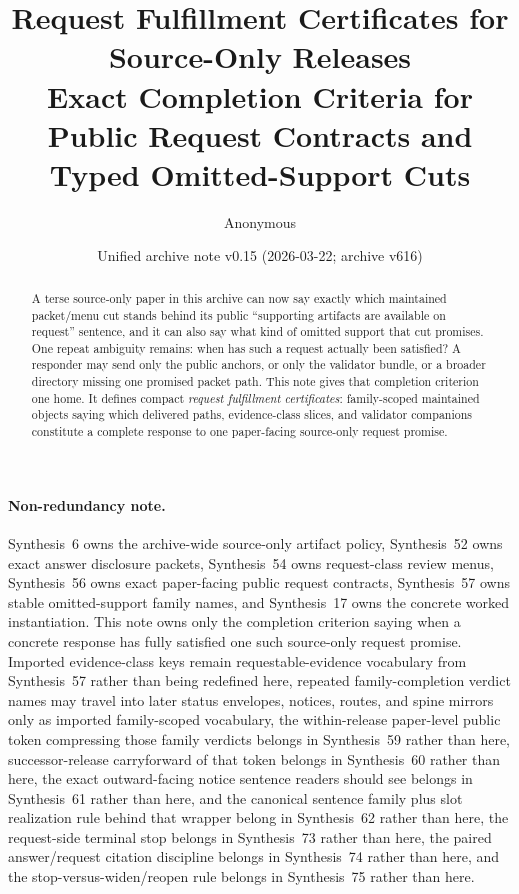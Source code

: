 \documentclass[11pt]{article}
\title{Request Fulfillment Certificates for Source-Only Releases\\\large Exact Completion Criteria for Public Request Contracts and Typed Omitted-Support Cuts}
\author{Anonymous}
\date{Unified archive note v0.15 (2026-03-22; archive v616)}
\begin{document}
\maketitle

\begin{abstract}
A terse source-only paper in this archive can now say exactly which maintained packet/menu cut stands behind its public ``supporting artifacts are available on request'' sentence, and it can also say what kind of omitted support that cut promises. One repeat ambiguity remains: when has such a request actually been satisfied? A responder may send only the public anchors, or only the validator bundle, or a broader directory missing one promised packet path. This note gives that completion criterion one home. It defines compact \emph{request fulfillment certificates}: family-scoped maintained objects saying which delivered paths, evidence-class slices, and validator companions constitute a complete response to one paper-facing source-only request promise.
\end{abstract}

\paragraph{Non-redundancy note.}
Synthesis~6 owns the archive-wide source-only artifact policy, Synthesis~52 owns exact answer disclosure packets, Synthesis~54 owns request-class review menus, Synthesis~56 owns exact paper-facing public request contracts, Synthesis~57 owns stable omitted-support family names, and Synthesis~17 owns the concrete worked instantiation.\cite{series:artifactpolicy,series:challengeanswerdisclosurepackets,series:challengeanswerreviewmenus,series:publicrequestcontracts,series:requestableevidenceclasses,series:workedexample}
This note owns only the completion criterion saying when a concrete response has fully satisfied one such source-only request promise. Imported evidence-class keys remain requestable-evidence vocabulary from Synthesis~57 rather than being redefined here, repeated family-completion verdict names may travel into later status envelopes, notices, routes, and spine mirrors only as imported family-scoped vocabulary, the within-release paper-level public token compressing those family verdicts belongs in Synthesis~59 rather than here, successor-release carryforward of that token belongs in Synthesis~60 rather than here, the exact outward-facing notice sentence readers should see belongs in Synthesis~61 rather than here, and the canonical sentence family plus slot realization rule behind that wrapper belong in Synthesis~62 rather than here, the request-side terminal stop belongs in Synthesis~73 rather than here, the paired answer/request citation discipline belongs in Synthesis~74 rather than here, and the stop-versus-widen/reopen rule belongs in Synthesis~75 rather than here.
\end{document}
